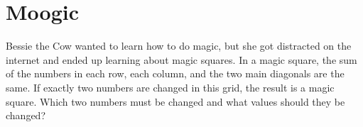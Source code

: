\documentclass{article}
\begin{document}
\section*{Moogic}
\begin{figure}
	\vspace{-20pt}
	\centering
	\vspace{-20pt}
\end{figure}
Bessie the Cow wanted to learn how to do magic, but she got distracted on the internet and ended up learning about magic squares.
In a magic square, the sum of the numbers in each row, each column, and the two main diagonals are the same.
If exactly two numbers are changed in this grid, the result is a magic square.
Which two numbers must be changed and what values should they be changed?
\end{document}
